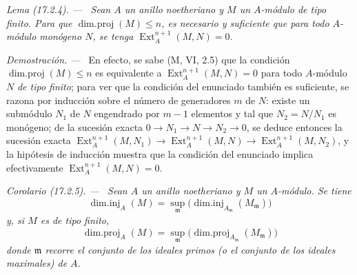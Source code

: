 \documentclass[10pt,oneside]{book}
\makeatletter
\newcommand{\setmanualcurrentlabel}[1]{\def\@currentlabel{#1}}
\newenvironment{corollary}[1][]{%
  \setmanualcurrentlabel{#1}\par\medskip\noindent\itshape Corolario (#1). ---\ }{\par}
\newenvironment{lemma}[1][]{%
  \setmanualcurrentlabel{#1}\par\medskip\noindent\itshape Lema (#1). ---\ }{\par}
\newenvironment{proof}{%
  \par\medskip\noindent\textit{Demostración. ---\ }}{\par}
\makeatother
\begin{document}
\begin{lemma}[17.2.4]
\label{0.17.2.4-es}
Sean $A$ un anillo noetheriano y $M$ un $A$-módulo de tipo finito. Para que
$\operatorname{dim.proj}(M)\leq n$, es necesario y suficiente que para todo
$A$-módulo \textup{monógeno} $N$, se tenga $\operatorname{Ext}^{n+1}_A(M,N)=0$.
\end{lemma}

\begin{proof}
En efecto, se sabe (M, VI, 2.5) que la condición
$\operatorname{dim.proj}(M)\leq n$ es equivalente a
$\operatorname{Ext}^{n+1}_A(M,N)=0$ para todo $A$-módulo $N$ \emph{de tipo
finito}; para ver que la condición del enunciado también es suficiente, se
razona por inducción sobre el número de generadores $m$ de $N$: existe un
submódulo $N_1$ de $N$ engendrado por $m-1$ elementos y tal que
$N_2=N/N_1$ es monógeno; de la sucesión exacta
$0\longrightarrow N_1\longrightarrow N\longrightarrow N_2\longrightarrow0$,
se deduce entonces la sucesión exacta
$\operatorname{Ext}^{n+1}_A(M,N_1)\longrightarrow
\operatorname{Ext}^{n+1}_A(M,N)\longrightarrow
\operatorname{Ext}^{n+1}_A(M,N_2)$, y la hipótesis de inducción muestra que la
condición del enunciado implica efectivamente $\operatorname{Ext}^{n+1}_A(M,N)=0$.
\end{proof}

\begin{corollary}[17.2.5]
\label{0.17.2.5-es}
Sean $A$ un anillo noetheriano y $M$ un $A$-módulo. Se tiene
\begin{equation}
\label{0.17.2.5.1-es}
\tag{17.2.5.1}
  \operatorname{dim.inj}_A(M)
  =\sup_{\mathfrak{m}}
  \bigl(\operatorname{dim.inj}_{A_{\mathfrak{m}}}(M_{\mathfrak{m}})\bigr)
\end{equation}
y, si $M$ es de tipo finito,
\begin{equation}
\label{0.17.2.5.2-es}
\tag{17.2.5.2}
  \operatorname{dim.proj}_A(M)
  =\sup_{\mathfrak{m}}
  \bigl(\operatorname{dim.proj}_{A_{\mathfrak{m}}}(M_{\mathfrak{m}})\bigr)
\end{equation}
donde $\mathfrak{m}$ recorre el conjunto de los ideales primos (o el conjunto de los
ideales maximales) de $A$.
\end{corollary}
\end{document}
